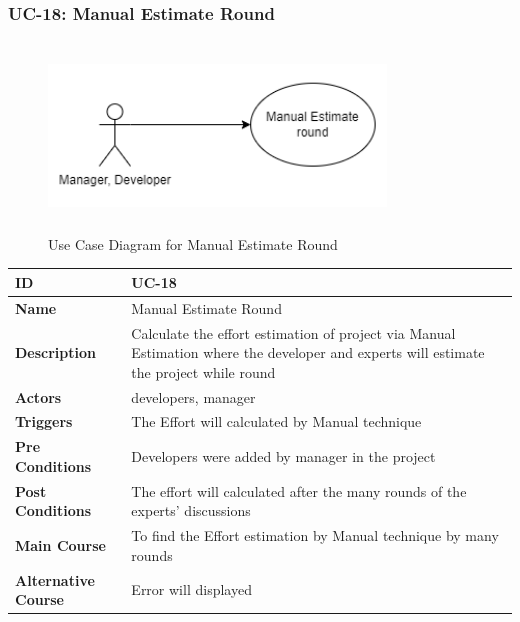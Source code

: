     \subsubsection{UC-18: Manual Estimate Round}
    \begin{figure}[H]
        \includegraphics[height=5cm, width=0.8\textwidth]{./diagrams/Use Case/u18.png}
        \centering 
        \caption{Use Case Diagram for Manual Estimate Round}
        \label{fig:Usecase1}
        \end{figure}
        
    \begin{center}
        \begin{tabularx}{\textwidth}{|l|X|}
            \hline
            \textbf{ID} & UC-18 \\
            \hline
            \textbf{Name} & Manual Estimate Round \\
            \hline
            \textbf{Description} & Calculate the effort estimation of project via Manual Estimation where the developer and experts will estimate the project while round \\
            \hline
            \textbf{Actors} & developers, manager \\
            \hline
            \textbf{Triggers} & The Effort will calculated by Manual technique \\
            \hline
            \textbf{Pre Conditions} & Developers were added by manager  in the project \\
            \hline
            \textbf{Post Conditions} & The effort will calculated after the many rounds of the experts' discussions  \\
            \hline
            \textbf{Main Course} & To find the Effort estimation by Manual technique by many rounds \\
            \hline
            \textbf{Alternative Course} & Error will displayed \\
            \hline
            
        \end{tabularx}
    \end{center}
    
